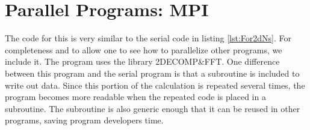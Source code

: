 \section{Parallel Programs: MPI}

The code for this is very similar to the serial code in listing \ref{lst:For2dNs}. For completeness and to allow one to see how to parallelize other programs, we include it. The program uses the library 2DECOMP\&FFT. One difference between this program and the serial program is that a subroutine is included to write out data. Since this portion of the calculation is repeated several times, the program becomes more readable when the repeated code is placed in a subroutine. The subroutine is also generic enough that it can be reused in other programs, saving program developers time.








